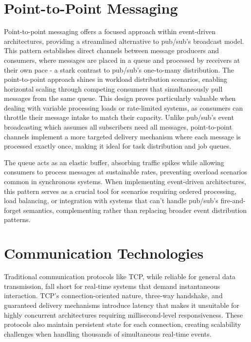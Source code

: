 \documentclass[]{final}
\begin{document}
\section{Point-to-Point Messaging}
Point-to-point messaging offers a focused approach within event-driven
architectures, providing a streamlined alternative to pub/sub's broadcast
model. This pattern establishes direct channels between message producers
and consumers, where messages are placed in a queue and processed by
receivers at their own pace - a stark contrast to pub/sub's one-to-many
distribution. The point-to-point approach shines in workload distribution
scenarios, enabling horizontal scaling through competing consumers that
simultaneously pull messages from the same queue. This design proves
particularly valuable when dealing with variable processing loads or
rate-limited systems, as consumers can throttle their message intake to
match their capacity. Unlike pub/sub's event broadcasting which
assumes all subscribers need all messages, point-to-point channels
implement a more targeted delivery mechanism where each message is
processed exactly once, making it ideal for task distribution and
job queues.

The queue acts as an elastic buffer, absorbing traffic
spikes while allowing consumers to process messages at sustainable
rates, preventing overload scenarios common in synchronous systems.
When implementing event-driven architectures, this pattern serves as
a crucial tool for scenarios requiring ordered processing, load
balancing, or integration with systems that can't handle
pub/sub's fire-and-forget semantics, complementing rather than
replacing broader event distribution patterns.

\section{Communication Technologies}


Traditional communication protocols like TCP, while reliable for general data
transmission, fall short for real-time systems that demand instantaneous
interaction. TCP's connection-oriented nature, three-way handshake, and
guaranteed delivery mechanisms introduce latency that makes it unsuitable for
highly concurrent architectures requiring millisecond-level responsiveness.
These protocols also maintain persistent state for each connection, creating
scalability challenges when handling thousands of simultaneous real-time
events.
\end{document}
